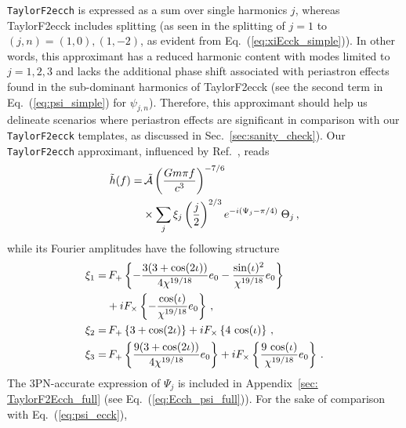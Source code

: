 \documentclass[aps,prd,twocolumn,superscriptaddress,groupedaddress,nofootinbib,showpacs,eqsecnum,useAms]{revtex4-2}
\begin{document}
\texttt{TaylorF2ecch} 
is expressed as a sum over single harmonics $j$, whereas TaylorF2ecck includes splitting (as seen in the splitting of $j=1$ to $(j,n)=(1,0),(1,-2)$, as evident from  Eq.~(\ref{eq:xiEcck_simple})). 
In other words,
this approximant has a reduced harmonic content with modes limited to $j=1,2,3$ and lacks the additional phase shift associated with periastron effects found in the sub-dominant harmonics of TaylorF2ecck (see the second term in Eq.~(\ref{eq:psi_simple})
for $\psi_{j,n}$).
Therefore, this approximant should help us delineate scenarios where  periastron effects are significant 
in comparison with our \texttt{TaylorF2ecck} templates, as discussed in Sec.~\ref{sec:sanity_check}). 
Our \texttt{TaylorF2ecch} approximant, influenced by Ref.~\cite{THG}, reads
\begin{align}
\tilde{h}(f) = & \, {\cal \tilde{A}} \left(\frac{Gm\pi f}{c^3}\right)^{-7/6}\notag \\ 
& \times \sum_{j} \xi_{j} \left(\frac{j}{2}\right)^{2/3} e^{-i(\Psi_{j}-\pi/4)}\; \Theta_{j}\,,
\end{align}
while its Fourier amplitudes  have the following structure 
\begin{align}
\xi_{1} =&\, F_+\left\{-\frac{3(3+\cos(2\iota))}{4\chi^{19/18}}e_0 - \frac{\sin(\iota)^2}{\chi^{19/18}}e_0\right\} \notag \\
&+ i F_\times\left\{-\frac{\cos(\iota)}{\chi^{19/18}}e_0 \right\}\,, \notag\\ 
\xi_{2} =&\, F_+\left\{3 + \cos(2\iota)\right\} + i F_\times\left\{4\,\cos(\iota)\right\}\,, \notag \\ 
\xi_{3} =&\, F_+\left\{ \frac{9(3+\cos(2\iota))}{4\chi^{19/18}}e_0 \right\} + i F_\times \left\{\frac{9\,\cos(\iota)}{\chi^{19/18}}e_0 \right\}\,. \label{eq:xiEcch_simple}
\end{align}
The 3PN-accurate expression of $\Psi_{j}$ is included in Appendix~\ref{sec: TaylorF2Ecch_full} (see Eq.~(\ref{eq:Ecch_psi_full})). For the sake of comparison with Eq.~(\ref{eq:psi_ecck}),
\end{document}
